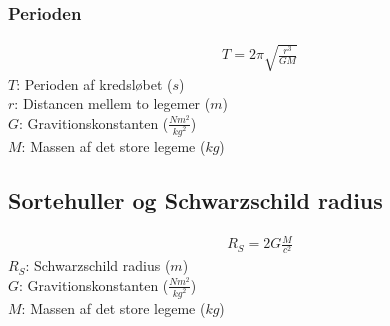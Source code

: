 	\subsubsection{Perioden}
		\begin{align}
			T=2\pi\sqrt{\frac{r^3}{GM}}
		\end{align}
		$T$: Perioden af kredsløbet ($s$)\\
		$r$: Distancen mellem to legemer ($m$)\\
		$G$: Gravitionskonstanten ($\frac{Nm^2}{kg^2}$)\\
		$M$: Massen af det store legeme ($kg$)

\subsection{Sortehuller og Schwarzschild radius}
	\begin{align}
		R_S=2G\frac{M}{c^2}
	\end{align}
	$R_S$: Schwarzschild radius ($m$)\\
	$G$: Gravitionskonstanten ($\frac{Nm^2}{kg^2}$)\\
	$M$: Massen af det store legeme ($kg$)\\
	\lyshast